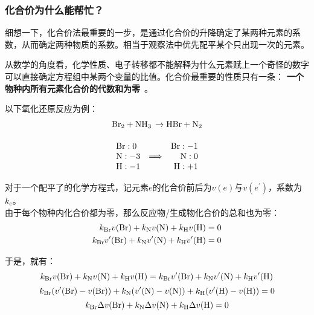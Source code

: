 \documentclass{ctexart}
\begin{document}
\subsubsection{化合价为什么能帮忙？}
细想一下，化合价法最重要的一步，是通过化合价的升降确定了某两种元素的系数，从而确定两种物质的系数。相当于观察法中优先配平某个只出现一次的元素。

从数学的角度看，化学性质、电子转移都不能解释为什么元素赋上一个奇怪的数字可以直接确定方程组中某两个变量的比值。化合价最重要的性质只有一条：
\textbf{一个物种内所有元素化合价的代数和为零}~\cite[98]{HuaXueJiuNianJiShangCe}。
\vspace{1em}

\noindent
\begin{minipage}[c]{0.4\textwidth}
    以下氧化还原反应为例：
    \begin{gather*}
        \ce{Br2 + NH3 \to HBr + N2}\\[1em]
        \begin{array}{lcr}
            \ce{Br}: 0 & &\ce{Br}: -1\\
            \ce{N}: -3 &\Longrightarrow &\ce{N}: 0\\
            \ce{H}: -1 & &\ce{H}: +1
        \end{array}
    \end{gather*}
\end{minipage}%
\hfill
\begin{minipage}[c]{0.55\textwidth}
    对于一个配平了的化学方程式，记元素\(e\)的化合价前后为\(v(e)\)与\(v(e^{\prime})\)，系数为\(k_{e}\)。\\[1em]
    由于每个物种内化合价都为零，那么反应物/生成物化合价的总和也为零：
    \begin{align*}
        k_{\ce{Br}} v(\ce{Br}) + k_{\ce{N}} v(\ce{N}) + k_{\ce{H}}
        v(\ce{H}) &= 0\\
        k_{\ce{Br}} v'(\ce{Br}) + k_{\ce{N}} v'(\ce{N}) + k_{\ce{H}}
        v'(\ce{H}) &= 0
    \end{align*}
\end{minipage}
\vspace{1em}

于是，就有：
\[
    k_{\ce{Br}} v(\ce{Br}) + k_{\ce{N}} v(\ce{N}) + k_{\ce{H}}
    v(\ce{H}) = k_{\ce{Br}} v'(\ce{Br}) + k_{\ce{N}} v'(\ce{N}) + k_{\ce{H}}
    v'(\ce{H})
\]
\[
    k_{\ce{Br}} (v'(\ce{Br}) - v(\ce{Br})) + k_{\ce{N}} (v'(\ce{N}) -
    v(\ce{N})) + k_{\ce{H}} (v'(\ce{H}) - v(\ce{H})) = 0
\]
\[
    k_{\ce{Br}} \Delta v(\ce{Br}) + k_{\ce{N}} \Delta v(\ce{N}) + k_{\ce{H}}
    \Delta v(\ce{H}) = 0
\]
\end{document}
